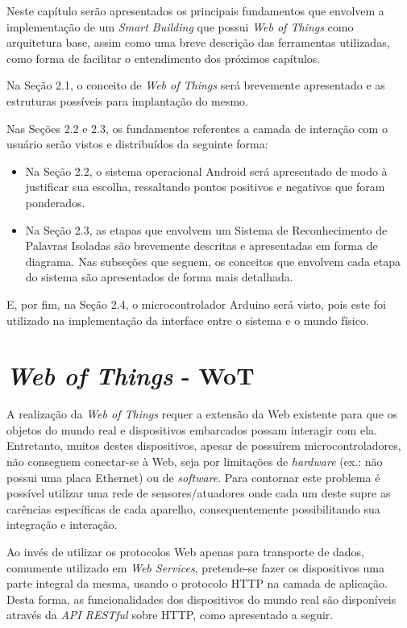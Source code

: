 \documentclass[12pt,a4paper,oneside]{report}
\begin{document}
Neste capítulo serão apresentados os principais fundamentos que envolvem a implementação de um \emph{Smart Building} que possui \emph{Web of Things} como arquitetura base, assim como uma breve descrição das ferramentas utilizadas, como forma de facilitar o entendimento dos próximos capítulos.

Na Seção 2.1, o conceito de \emph{Web of Things} será brevemente apresentado e as estruturas possíveis para implantação do mesmo.

Nas Seções 2.2 e 2.3, os fundamentos referentes a camada de interação com o usuário serão vistos e distribuídos da seguinte forma:
\begin{itemize}
    \item Na Seção 2.2, o sistema operacional Android será apresentado de modo à justificar sua escolha, ressaltando pontos positivos e negativos que foram ponderados.
    \item Na Seção 2.3, as etapas que envolvem um Sistema de Reconhecimento de Palavras Isoladas são brevemente descritas e apresentadas em forma de diagrama. Nas subseções que seguem, os conceitos que envolvem cada etapa do sistema são apresentados de forma mais detalhada.
\end{itemize}

E, por fim, na Seção 2.4, o microcontrolador Arduino será visto, pois este foi utilizado na implementação da interface entre o sistema e o mundo físico.

%
%
\section{\emph{Web of Things} - WoT}

A realização da \emph{Web of Things} requer a extensão da Web existente para que os objetos do mundo real e dispositivos embarcados possam interagir com ela. Entretanto, muitos destes dispositivos, apesar de possuírem microcontroladores, não conseguem conectar-se à Web, seja por limitações de \emph{hardware} (ex.: não possui uma placa Ethernet) ou de \emph{software}. Para contornar este problema é possível utilizar uma rede de sensores/atuadores onde cada um deste supre as carências específicas de cada aparelho, consequentemente possibilitando sua integração e interação.

Ao invés de utilizar os protocolos Web apenas para transporte de dados, comumente utilizado em \emph{Web Services}, pretende-se fazer os dispositivos uma parte integral da mesma, usando o protocolo HTTP na camada de aplicação. Desta forma, as funcionalidades dos dispositivos do mundo real são disponíveis através da \emph{API RESTful} \cite{restws} sobre HTTP, como apresentado a seguir.
\end{document}
